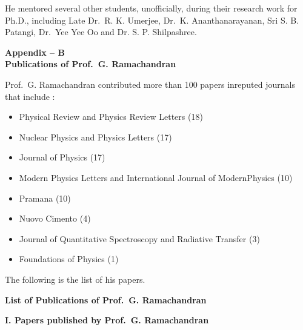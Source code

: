 He mentored several other students, unofficially, during their research work for Ph.D., including Late Dr.\ R. K. Umerjee, Dr.\ K. Ananthanarayanan, Sri S. B. Patangi, Dr.\ Yee Yee Oo and Dr. S. P. Shilpashree.

\newpage

\begin{center}
\textbf{Appendix -- B}\\[4pt]
\textbf{Publications of Prof.\ G. Ramachandran}
\end{center}

Prof.\ G. Ramachandran contributed more than 100 papers in\break reputed journals that include :
\begin{itemize}
\item Physical Review and Physics Review Letters (18)
\item Nuclear Physics and Physics Letters (17)
\item Journal of Physics (17)
\item Modern Physics Letters and International Journal of Modern\break Physics (10) 
\item Pramana (10)
\item Nuovo Cimento (4)
\item Journal of Quantitative Spectroscopy and Radiative Transfer (3)
\item Foundations of Physics (1)
\end{itemize}

The following is the list of his papers.

\newpage

\begin{center}
{\large\bfseries List of Publications of Prof.\ G. Ramachandran}
\end{center}

\noindent
\textbf{I. Papers published by Prof.\ G. Ramachandran}

\medskip

